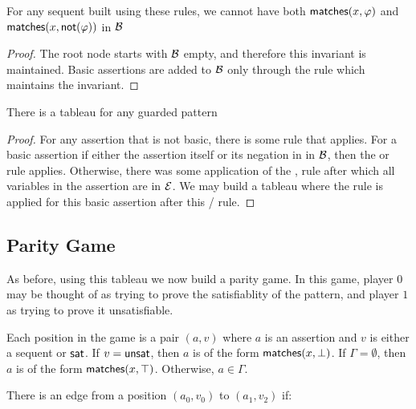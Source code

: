 \begin{proposition}For any sequent built using these rules, we cannot have both \(\mathsf{matches}(x,\allowbreak \varphi)\) and \(\mathsf{matches}(x,\allowbreak \mathsf{not}(\varphi))\) in \(\mathcal{B}\)\end{proposition}

\begin{proof}The root node starts with \(\mathcal{B}\) empty, and therefore this invariant is
maintained. Basic assertions are added to \(\mathcal{B}\) only through the
 rule which maintains the invariant.\end{proof}

\begin{proposition}There is a tableau for any guarded pattern\end{proposition}

\begin{proof}For any assertion that is not basic, there is some rule that applies.
For a basic assertion if either the assertion itself or its negation in in \(\mathcal{B}\),
then the  or  rule applies.
Otherwise, there was some application of the ,  rule
after which all variables in the assertion are in \(\mathcal{E}\).
We may build a tableau where the  rule
is applied for this basic assertion after this / rule.\end{proof}

\hypertarget{parity-game}{%
\subsection{Parity Game}\label{parity-game}}

As before, using this tableau we now build a parity game.
In this game, player \(0\) may be thought of as trying to prove the satisfiablity of the pattern,
and player \(1\) as trying to prove it unsatisfiable.

Each position in the game is a pair \((a, v)\) where \(a\) is an assertion
and \(v\) is either a sequent or \(\mathsf{sat}\).
If \(v = \mathsf{unsat}\), then \(a\) is of the form \(\mathsf{matches}(x,\allowbreak \bot)\).
If \(\Gamma = \emptyset\), then \(a\) is of the form \(\mathsf{matches}(x,\allowbreak \top)\).
Otherwise, \(a \in \Gamma\).

There is an edge from a position \((a_0, v_0)\) to \((a_1, v_2)\) if:

